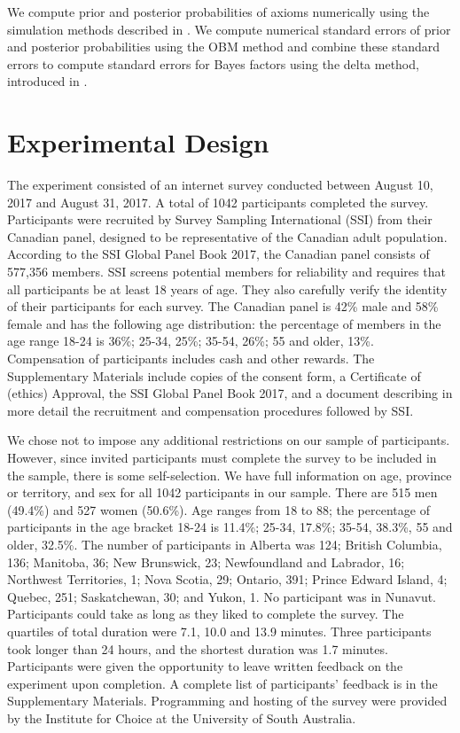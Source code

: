\documentclass[11pt,letter]{article}
\begin{document}
We compute prior and posterior probabilities of axioms numerically using the simulation methods described in .
We compute numerical standard errors of prior and posterior probabilities using the OBM method and combine these standard errors to compute standard errors for Bayes factors using the delta method, introduced in .

\section{Experimental Design}\label{s:design}

The experiment consisted of an internet survey conducted between August 10, 2017 and August 31, 2017.
A total of 1042 participants completed the survey.
Participants were recruited by Survey Sampling International (SSI) from their Canadian panel, designed to be representative of the Canadian adult population.
According to the SSI Global Panel Book 2017, the Canadian panel consists of 577,356 members.
SSI screens potential members for reliability and requires that all participants be at least 18 years of age.
They also carefully verify the identity of their participants for each survey.
The Canadian panel is 42\% male and 58\% female and has the following age distribution: the percentage of members in the age range 18-24 is 36\%; 25-34, 25\%; 35-54, 26\%; 55 and older, 13\%.
Compensation of participants includes cash and other rewards.
The Supplementary Materials include copies of the consent form, a Certificate of (ethics) Approval, the SSI Global Panel Book 2017, and a document describing in more detail the recruitment and compensation procedures followed by SSI.

We chose not to impose any additional restrictions on our sample of participants.
However, since invited participants must complete the survey to be included in the sample, there is some self-selection.
We have full information on age, province or territory, and sex for all 1042 participants in our sample.
There are 515 men (49.4\%) and 527 women (50.6\%).
Age ranges from 18 to 88; the percentage of participants in the age bracket 18-24 is 11.4\%; 25-34, 17.8\%; 35-54, 38.3\%, 55 and older, 32.5\%.
The number of participants in Alberta was 124; British Columbia, 136; Manitoba, 36; New Brunswick, 23; Newfoundland and Labrador, 16; Northwest Territories, 1; Nova Scotia, 29; Ontario, 391; Prince Edward Island, 4; Quebec, 251; Saskatchewan, 30; and Yukon, 1.
No participant was in Nunavut.
Participants could take as long as they liked to complete the survey.
The quartiles of total duration were 7.1, 10.0 and 13.9 minutes.
Three participants took longer than 24 hours, and the shortest duration was 1.7 minutes.
Participants were given the opportunity to leave written feedback on the experiment upon completion.
A complete list of participants' feedback is in the Supplementary Materials.
Programming and hosting of the survey were provided by the Institute for Choice at the University of South Australia.
\end{document}
